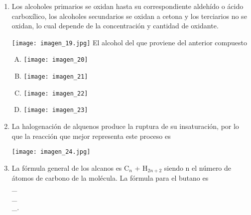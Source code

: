\begin{enumerate}
\item Los alcoholes primarios se oxidan hasta su correspondiente aldehído o ácido carboxílico, los alcoholes secundarios se oxidan a cetona y los terciarios no se oxidan, lo cual depende de la concentración y cantidad de oxidante. \label{mon-23}

\texttt{[image: imagen\_19.jpg]}
El alcohol del que proviene del anterior compuesto 
\begin{enumerate}[(A)]
\item \texttt{[image: imagen\_20]}
\item \texttt{[image: imagen\_21]}
\item \texttt{[image: imagen\_22]}
\item \texttt{[image: imagen\_23]}
\end{enumerate}


\item La halogenación de alquenos produce la ruptura de su insaturación, por lo que la reacción que mejor representa este proceso es \label{mon-24}


\texttt{[image: imagen\_24.jpg]}



\item La fórmula general de los alcanos es C$_n$ + H$_{2n+2}$ siendo n el número de átomos de carbono de la molécula. La fórmula para el butano es  \label{mon-25}\hrulefill\\
\_\hrulefill\\
\_\hrulefill\\
\_\hrulefill.



\end{enumerate}


